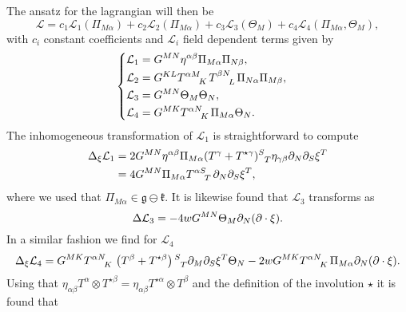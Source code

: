 The ansatz for the lagrangian will then be
\begin{equation}
    \mathcal{L} = c_1\mathcal{L}_1(\Pi_{M\alpha})+c_2\mathcal{L}_2(\Pi_{M\alpha})+c_3\mathcal{L}_3(\Theta_M)+c_4\mathcal{L}_4(\Pi_{M\alpha},\Theta_M),
\end{equation}
with $c_i$ constant coefficients and $\mathcal{L}_i$ field dependent terms given by 
\begin{equation}
    \begin{cases}\begin{aligned}
        \mathcal{L}_1 &= G^{MN}\eta^{\alpha\beta}\Pi_{M\alpha}\Pi_{N\beta},\\
        \mathcal{L}_2 &= G^{KL}\tensor{T}{^{\alpha M}_K}\tensor{T}{^{\beta N}_L}\Pi_{N\alpha}\Pi_{M\beta},\\
        \mathcal{L}_3 &= G^{MN}\Theta_M\Theta_N,\\
        \mathcal{L}_4 &= G^{MK}\tensor{T}{^{\alpha N}_K}\Pi_{M\alpha}\Theta_{N}.
    \end{aligned}
    \end{cases}
\end{equation}
The inhomogeneous transformation of $\mathcal{L}_1$ is straightforward to compute
\begin{equation}
    \begin{aligned}
        \Delta_\xi \mathcal{L}_1 &= 2G^{MN}\eta^{\alpha\beta}\Pi_{M\alpha}(T^{\gamma}+T^{\star\gamma})\tensor{}{^S_T}\eta_{\gamma\beta}\pd_N\pd_S\xi^T\\
        &= 4G^{MN}\Pi_{M\alpha}\tensor{T}{^{\alpha S}_T}\pd_N\pd_S\xi^T,
    \end{aligned}
\end{equation}
where we used that $\Pi_{M\alpha}\in\mathfrak{g}\ominus\mathfrak{k}$. It is likewise found that $\mathcal{L}_3$ transforms as 
\begin{equation}
    \Delta \mathcal{L}_3 = -4wG^{MN}\Theta_M\partial_N(\partial\cdot \xi).
\end{equation}
In a similar fashion we find for $\mathcal{L}_4$  
\begin{equation}
        \Delta_\xi \mathcal{L}_4 = G^{MK}\tensor{T}{^{\alpha N}_K}\left(T^\beta+T^{\star\beta}\right)\tensor{}{^S_T}\pd_M\pd_S\xi^T\Theta_N-2wG^{MK}\tensor{T}{^{\alpha N}_K}\Pi_{M\alpha}\pd_N(\pd\cdot \xi).
\end{equation}
Using that $\eta_{\alpha\beta}T^\alpha\otimes T^{\star\beta} = \eta_{\alpha\beta}T^{\star\alpha}\otimes T^{\beta}$ and the definition of the involution $\star$ it is found that
